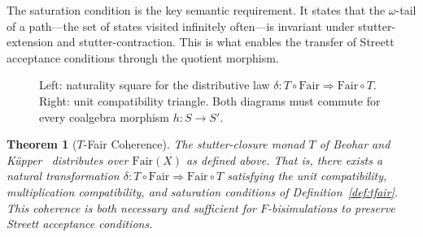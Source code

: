 \documentclass[11pt]{article}
\newtheorem{theorem}{Theorem}
\newcommand{\Fair}{\ensuremath{\mathrm{Fair}}}
\newcommand{\TFair}{$T$-Fair}
\begin{document}
The saturation condition is the key semantic requirement.
It states that the $\omega$-tail of a path---the set of states visited
infinitely often---is invariant under stutter-extension and
stutter-contraction.
This is what enables the transfer of Streett acceptance conditions through
the quotient morphism.

\begin{figure}[t]
\centering
{}
\caption{Left: naturality square for the distributive law
  $\delta : T \circ \Fair \Rightarrow \Fair \circ T$.
  Right: unit compatibility triangle.
  Both diagrams must commute for every coalgebra morphism $h : S \to S'$.}
\label{fig:coherence}
\end{figure}

\begin{theorem}[\TFair{} Coherence]
\label{thm:tfair}
The stutter-closure monad $T$ of Beohar and K\"upper~\cite{BeoharK17}
distributes over $\Fair(X)$ as defined above.
That is, there exists a natural transformation
$\delta : T \circ \Fair \Rightarrow \Fair \circ T$ satisfying the unit
compatibility, multiplication compatibility, and saturation conditions
of Definition~\ref{def:tfair}.
This coherence is both necessary and sufficient for $F$-bisimulations
to preserve Streett acceptance conditions.
\end{theorem}
\end{document}
